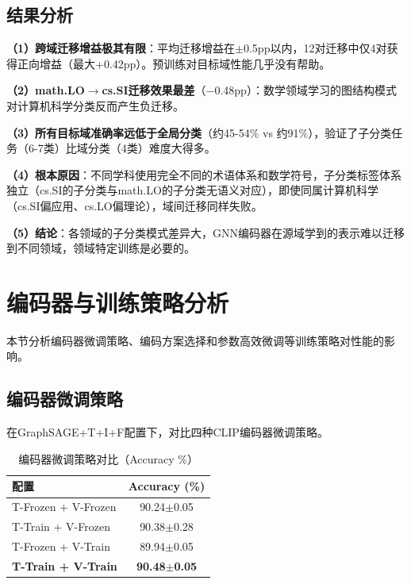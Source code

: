 \subsection{结果分析}

\textbf{（1）跨域迁移增益极其有限}：平均迁移增益在$\pm$0.5pp以内，12对迁移中仅4对获得正向增益（最大+0.42pp）。预训练对目标域性能几乎没有帮助。

\textbf{（2）math.LO$\to$cs.SI迁移效果最差}（$-$0.48pp）：数学领域学习的图结构模式对计算机科学分类反而产生负迁移。

\textbf{（3）所有目标域准确率远低于全局分类}（约45-54\% vs 约91\%），验证了子分类任务（6-7类）比域分类（4类）难度大得多。

\textbf{（4）根本原因}：不同学科使用完全不同的术语体系和数学符号，子分类标签体系独立（cs.SI的子分类与math.LO的子分类无语义对应），即使同属计算机科学（cs.SI偏应用、cs.LO偏理论），域间迁移同样失败。

\textbf{（5）结论}：各领域的子分类模式差异大，GNN编码器在源域学到的表示难以迁移到不同领域，领域特定训练是必要的。

\section{编码器与训练策略分析}

本节分析编码器微调策略、编码方案选择和参数高效微调等训练策略对性能的影响。

\subsection{编码器微调策略}

在GraphSAGE+T+I+F配置下，对比四种CLIP编码器微调策略。

\begin{table}[htbp]
  \centering
  \caption{编码器微调策略对比（Accuracy \%）}
  \label{tab:encoder_tuning}
  \begin{tabular}{lc}
    \toprule
    配置 & Accuracy (\%) \\
    \midrule
    T-Frozen + V-Frozen & 90.24$\pm$0.05 \\
    T-Train + V-Frozen & 90.38$\pm$0.28 \\
    T-Frozen + V-Train & 89.94$\pm$0.05 \\
    \textbf{T-Train + V-Train} & \textbf{90.48$\pm$0.05} \\
    \bottomrule
  \end{tabular}
\end{table}

